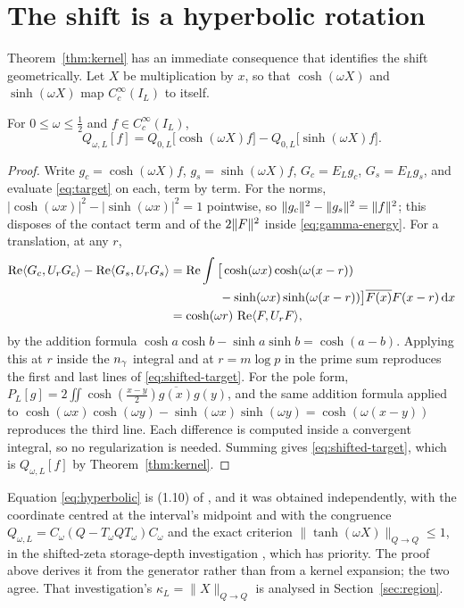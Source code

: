 \section{The shift is a hyperbolic rotation}\label{sec:hyperbolic}

Theorem~\ref{thm:kernel} has an immediate consequence that identifies the shift
geometrically. Let $X$ be multiplication by $x$, so that $\cosh(\omega X)$ and
$\sinh(\omega X)$ map $C_c^\infty(I_L)$ to itself.

\begin{proposition}\label{prop:hyperbolic}
For $0\leq\omega\leq\frac12$ and $f\in C_c^\infty(I_L)$,
\begin{equation}\label{eq:hyperbolic}
 Q_{\omega,L}[f]=Q_{0,L}\big[\cosh(\omega X)f\big]
 -Q_{0,L}\big[\sinh(\omega X)f\big].
\end{equation}
\end{proposition}

\begin{proof}
Write $g_c=\cosh(\omega X)f$, $g_s=\sinh(\omega X)f$, $G_c=E_Lg_c$,
$G_s=E_Lg_s$, and evaluate \eqref{eq:target} on each, term by term. For the
norms, $|\!\cosh(\omega x)|^2-|\!\sinh(\omega x)|^2=1$ pointwise, so
$\lVert g_c\rVert^2-\lVert g_s\rVert^2=\lVert f\rVert^2$; this disposes of the contact term and of
the $2\lVert F\rVert^2$ inside \eqref{eq:gamma-energy}. For a translation, at any
$r$,
\begin{align*}
 \operatorname{Re}\langle G_c,U_rG_c\rangle-\operatorname{Re}\langle G_s,U_rG_s\rangle
 &=\operatorname{Re}\int\big[\cosh(\omega x)\cosh(\omega(x-r))\\
 &\qquad\qquad-\sinh(\omega x)\sinh(\omega(x-r))\big]
   \overline{F(x)}F(x-r)\,\mathrm d x\\
 &=\cosh(\omega r)\,\operatorname{Re}\langle F,U_rF\rangle,
\end{align*}
by the addition formula $\cosh a\cosh b-\sinh a\sinh b=\cosh(a-b)$. Applying this
at $r$ inside the $n_{\gamma}$ integral and at $r=m\log p$ in the prime sum
reproduces the first and last lines of \eqref{eq:shifted-target}. For the pole
form, $P_L[g]=2\iint\cosh(\frac{x-y}2)\overline{g(x)}g(y)$, and the same addition
formula applied to $\cosh(\omega x)\cosh(\omega y)-\sinh(\omega x)\sinh(\omega y)
=\cosh(\omega(x-y))$ reproduces the third line. Each difference is computed
inside a convergent integral, so no regularization is needed. Summing gives
\eqref{eq:shifted-target}, which is $Q_{\omega,L}[f]$ by
Theorem~\ref{thm:kernel}.
\end{proof}

\begin{remark}[Attribution]\label{rem:attribution}
Equation \eqref{eq:hyperbolic} is (1.10) of \cite{Background}, and it was
obtained independently, with the coordinate centred at the interval's midpoint
and with the congruence
$Q_{\omega,L}=C_\omega(Q-T_\omega QT_\omega)C_\omega$ and the exact criterion
$\lVert\tanh(\omega X)\rVert_{Q\to Q}\leq1$, in the shifted-zeta storage-depth
investigation \cite{CriticalPath}, which has priority. The proof above derives it
from the generator rather than from a kernel expansion; the two agree. That
investigation's $\kappa_L=\lVert X\rVert_{Q\to Q}$ is analysed in
Section~\ref{sec:region}.
\end{remark}

